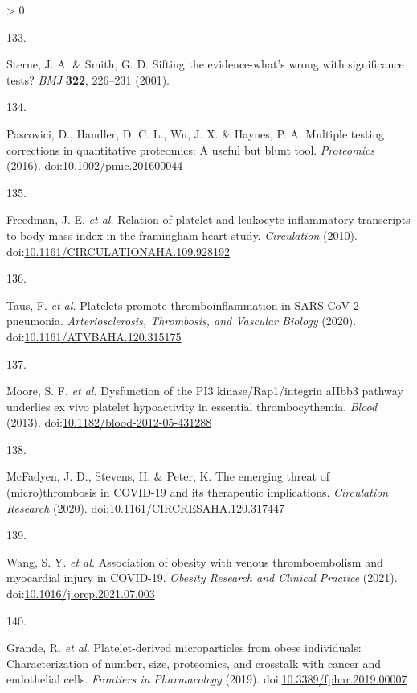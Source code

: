\documentclass[11pt,twoside]{bristolthesis}
\newlength{\cslhangindent}
\newlength{\csllabelwidth}
\newenvironment{CSLReferences}[2] %
 {%
  \setlength{\parindent}{0pt}
  \ifodd #1 \everypar{\setlength{\hangindent}{\cslhangindent}}\ignorespaces\fi
  \ifnum #2 > 0
  \setlength{\parskip}{#2\baselineskip}
  \fi
 }%
 {}
\newcommand{\CSLLeftMargin}[1]{\parbox[t]{\csllabelwidth}{#1}}
\newcommand{\CSLRightInline}[1]{\parbox[t]{\linewidth - \csllabelwidth}{#1}\break}
\begin{document}
\begin{CSLReferences}{0}{0}
\leavevmode\hypertarget{ref-Sterne2001}{}%
\CSLLeftMargin{133. }
\CSLRightInline{Sterne, J. A. \& Smith, G. D. Sifting the evidence-what's wrong with significance tests? \emph{BMJ} \textbf{322}, 226--231 (2001).}

\leavevmode\hypertarget{ref-Pascovici2016}{}%
\CSLLeftMargin{134. }
\CSLRightInline{Pascovici, D., Handler, D. C. L., Wu, J. X. \& Haynes, P. A. Multiple testing corrections in quantitative proteomics: A useful but blunt tool. \emph{Proteomics} (2016). doi:\href{https://doi.org/10.1002/pmic.201600044}{10.1002/pmic.201600044}}

\leavevmode\hypertarget{ref-Freedman2010}{}%
\CSLLeftMargin{135. }
\CSLRightInline{Freedman, J. E. \emph{et al.} Relation of platelet and leukocyte inflammatory transcripts to body mass index in the framingham heart study. \emph{Circulation} (2010). doi:\href{https://doi.org/10.1161/CIRCULATIONAHA.109.928192}{10.1161/CIRCULATIONAHA.109.928192}}

\leavevmode\hypertarget{ref-Taus2020}{}%
\CSLLeftMargin{136. }
\CSLRightInline{Taus, F. \emph{et al.} Platelets promote thromboinflammation in SARS-CoV-2 pneumonia. \emph{Arteriosclerosis, Thrombosis, and Vascular Biology} (2020). doi:\href{https://doi.org/10.1161/ATVBAHA.120.315175}{10.1161/ATVBAHA.120.315175}}

\leavevmode\hypertarget{ref-Moore2013}{}%
\CSLLeftMargin{137. }
\CSLRightInline{Moore, S. F. \emph{et al.} Dysfunction of the PI3 kinase/Rap1/integrin aIIbb3 pathway underlies ex vivo platelet hypoactivity in essential thrombocythemia. \emph{Blood} (2013). doi:\href{https://doi.org/10.1182/blood-2012-05-431288}{10.1182/blood-2012-05-431288}}

\leavevmode\hypertarget{ref-McFadyen2020}{}%
\CSLLeftMargin{138. }
\CSLRightInline{McFadyen, J. D., Stevens, H. \& Peter, K. The emerging threat of (micro)thrombosis in COVID-19 and its therapeutic implications. \emph{Circulation Research} (2020). doi:\href{https://doi.org/10.1161/CIRCRESAHA.120.317447}{10.1161/CIRCRESAHA.120.317447}}

\leavevmode\hypertarget{ref-Wang2021}{}%
\CSLLeftMargin{139. }
\CSLRightInline{Wang, S. Y. \emph{et al.} Association of obesity with venous thromboembolism and myocardial injury in COVID-19. \emph{Obesity Research and Clinical Practice} (2021). doi:\href{https://doi.org/10.1016/j.orcp.2021.07.003}{10.1016/j.orcp.2021.07.003}}

\leavevmode\hypertarget{ref-Grande2019}{}%
\CSLLeftMargin{140. }
\CSLRightInline{Grande, R. \emph{et al.} Platelet-derived microparticles from obese individuals: Characterization of number, size, proteomics, and crosstalk with cancer and endothelial cells. \emph{Frontiers in Pharmacology} (2019). doi:\href{https://doi.org/10.3389/fphar.2019.00007}{10.3389/fphar.2019.00007}}


\end{CSLReferences}
\end{document}
